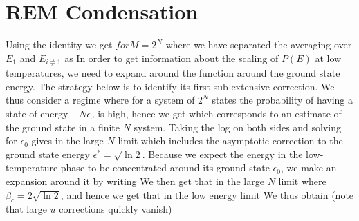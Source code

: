 \documentclass[letterpaper,english,10pt]{article}
\begin{document}
\section{REM Condensation}
\label{appendix:Condensation}
Using the identity 
we get $for M = 2^N$
where we have separated the averaging over $E_1$ and $E_{i \neq1}$ as 
In order to get information about the scaling of $P(E)$ at low temperatures, 
we need to expand around the function around the ground state energy. 
The strategy below is to identify its first sub-extensive correction. 
We thus consider a regime where for a system of $2^N$ states the probability of having a state of energy $-N\epsilon_0$ is high, hence we get 
which corresponds to an estimate of the ground state in a finite $N$ system. 
Taking the log on both sides and solving for $\epsilon_0$ gives in the large $N$ limit 
 which includes the asymptotic correction to the ground state energy $\epsilon^\ast = \sqrt{\ln 2}$. 
Because we expect the energy in the low-temperature phase to be concentrated around its ground
state $\epsilon_0$, we make an expansion around it by writing 
We then get that in the large $N$ limit 
where $\beta_c = 2\sqrt{\ln2}$, and hence we get that in the low energy limit 
We thus obtain (note that large $u$ corrections quickly vanish) 
\end{document}
